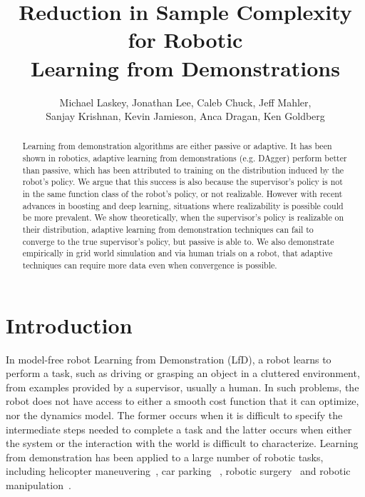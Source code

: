 \documentclass[10pt, conference]{ieeeconf}      %
\title{Reduction in Sample Complexity for Robotic\\
 Learning from Demonstrations}
\author{Michael Laskey, Jonathan Lee, Caleb Chuck, Jeff Mahler,\\ Sanjay Krishnan, Kevin Jamieson, Anca Dragan, Ken Goldberg}
\begin{document}
\maketitle
\thispagestyle{empty}
\pagestyle{empty}







\begin{abstract}
Learning from demonstration algorithms are either passive or adaptive. It has been shown in robotics, adaptive learning from demonstrations (e.g. DAgger) perform better than passive, which has been attributed to training on the distribution induced by the robot's policy. We argue that this success is also because the supervisor's policy  is not in the same function class of the robot's policy, or not realizable. However with recent advances in boosting and deep learning, situations where realizability is possible could be more prevalent.  We show theoretically, when the supervisor's policy is realizable on their distribution, adaptive learning from demonstration techniques can fail to converge to the true supervisor's policy, but passive is able to. We also demonstrate empirically in grid world simulation and via human trials on a robot, that adaptive techniques can require more data even when convergence is possible.
 \end{abstract}


\section{Introduction} 
In model-free robot Learning from Demonstration (LfD), a robot learns to perform a task, such as driving or grasping an object in a cluttered environment, from examples provided by a  supervisor, usually a human.  In such problems, the robot does not have access to either a smooth cost function that it can optimize, nor the dynamics model. The former occurs when it is difficult to specify the intermediate steps needed to complete a task and the latter occurs when either the system or the interaction with the world is difficult to characterize. Learning from demonstration has been applied to a large number of robotic tasks, including helicopter maneuvering~\cite{abbeel2007application}, car parking~\cite{abbeel2008apprenticeship} , robotic surgery~\cite{van2010superhuman,laskeyshiv} and robotic manipulation~\cite{laskeyrobot}.
\end{document}

